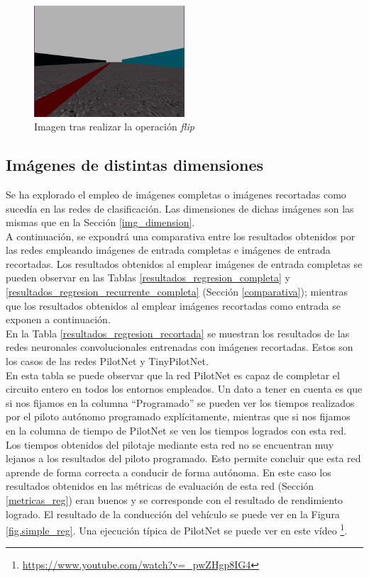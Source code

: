 \begin{figure}
\begin{center}
	\includegraphics[width=0.5\textwidth]{figures/Regresion/img_flip.png}
   \caption{Imagen tras realizar la operación \textit{flip}}
	\label{fig.image_flip}
\end{center}
\end{figure}



\subsection{Imágenes de distintas dimensiones}

Se ha explorado el empleo de imágenes completas o imágenes recortadas como sucedía en las redes de clasificación. Las dimensiones de dichas imágenes son las mismas que en la Sección \ref{img_dimension}.\\

A continuación, se expondrá una comparativa entre los resultados obtenidos por las redes empleando imágenes de entrada completas e imágenes de entrada recortadas. Los resultados obtenidos al emplear imágenes de entrada completas se pueden observar en las Tablas \ref{resultados_regresion_completa} y 
\ref{resultados_regresion_recurrente_completa} (Sección \ref{comparativa}); mientras que los resultados obtenidos al emplear imágenes recortadas como entrada se exponen a continuación.\\

En la Tabla \ref{resultados_regresion_recortada} se muestran los resultados de las redes neuronales convolucionales entrenadas con imágenes recortadas. Estos son los casos de las redes PilotNet y TinyPilotNet.\\

En esta tabla se puede observar que la red PilotNet es capaz de completar el circuito entero en todos los entornos empleados. Un dato a tener en cuenta es que si nos fijamos en la columna ``Programado'' se pueden ver los tiempos realizados por el piloto autónomo programado explícitamente, mientras que si nos fijamos en la columna de tiempo de PilotNet se ven los tiempos logrados con esta red. Los tiempos obtenidos del pilotaje mediante esta red no se encuentran muy lejanos a los resultados del piloto programado. Esto permite concluir que esta red aprende de forma correcta a conducir de forma autónoma. En este caso los resultados obtenidos en las métricas de evaluación de esta red (Sección \ref{metricas_reg}) eran buenos y se corresponde con el resultado de rendimiento logrado. El resultado de la conducción del vehículo se puede ver en la Figura \ref{fig.simple_reg}. Una ejecución típica de PilotNet se puede ver en este vídeo  \footnote{\url{https://www.youtube.com/watch?v=_pwZHgp8IG4}}.

